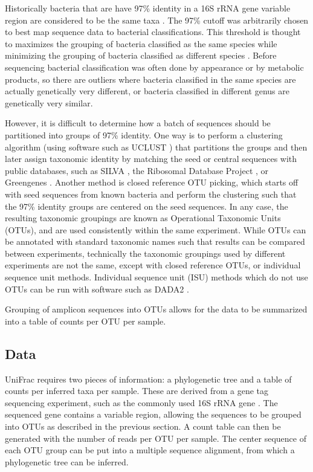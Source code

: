 \documentclass[10pt,letterpaper]{article}
\begin{document}
Historically bacteria that are have 97\% identity in a 16S rRNA gene variable region are considered to be the same taxa \cite{ciccarelli2006toward}. The 97\% cutoff was arbitrarily chosen to best map sequence data to bacterial classifications. This threshold is thought to maximizes the grouping of bacteria classified as the same species while minimizing the grouping of bacteria classified as different species \cite{caporaso2011global}. Before sequencing bacterial classification was often done by appearance or by metabolic products, so there are outliers where bacteria classified in the same species are actually genetically very different, or bacteria classified in different genus are genetically very similar.

However, it is difficult to determine how a batch of sequences should be partitioned into groups of 97\% identity. One way is to perform a clustering algorithm (using software such as UCLUST \cite{edgar2010search}) that partitions the groups and then later assign taxonomic identity by matching the seed or central sequences with public databases, such as SILVA \cite{quast2013silva}, the Ribosomal Database Project \cite{cole2009ribosomal}, or Greengenes \cite{desantis2006greengenes}. Another method is closed reference OTU picking, which starts off with seed sequences from known bacteria and perform the clustering such that the 97\% identity groups are centered on the seed sequences. In any case, the resulting taxonomic groupings are known as Operational Taxonomic Units (OTUs), and are used consistently within the same experiment. While OTUs can be annotated with standard taxonomic names such that results can be compared between experiments, technically the taxonomic groupings used by different experiments are not the same, except with closed reference OTUs, or individual sequence unit methods. Individual sequence unit (ISU) methods which do not use OTUs can be run with software such as DADA2 \cite{callahan2015dada2}.

Grouping of amplicon sequences into OTUs allows for the data to be summarized into a table of counts per OTU per sample.

\subsection{Data}
UniFrac requires two pieces of information: a phylogenetic tree and a table of counts per inferred taxa per sample. These are derived from a gene tag sequencing experiment, such as the commonly used 16S rRNA gene \cite{tringe2008renaissance}. The sequenced gene contains a variable region, allowing the sequences to be grouped into OTUs as described in the previous section. A count table can then be generated with the number of reads per OTU per sample. The center sequence of each OTU group can be put into a multiple sequence alignment, from which a phylogenetic tree can be inferred.
\end{document}
